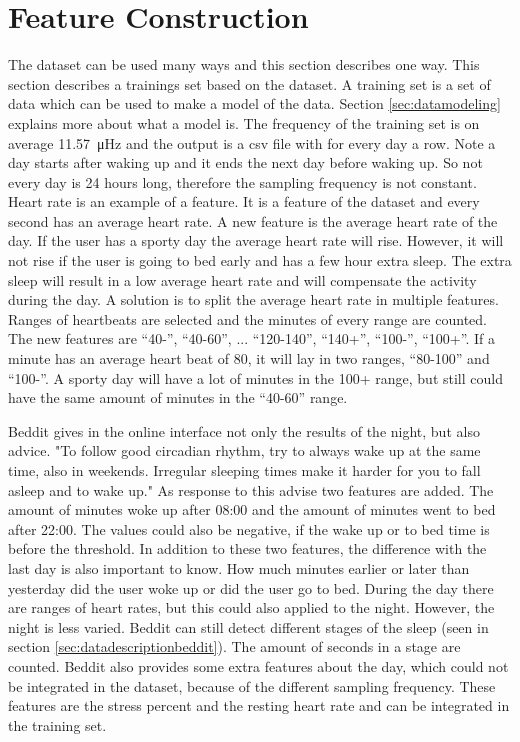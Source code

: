 	\section{Feature Construction}
		\label{sec:feature}
				The dataset can be used many ways and this section describes one way. This section describes a trainings set based on the dataset. A training set is a set of data which can be used to make a model of the data. Section \ref{sec:datamodeling} explains more about what a model is. The frequency of the training set is on average \SI{11.57}{\micro\hertz} and the output is a csv file with for every day a row. Note a day starts after waking up and it ends the next day before waking up. So not every day is 24 hours long, therefore the sampling frequency is not constant. Heart rate is an example of a feature. It is a feature of the dataset and every second has an average heart rate. A new feature is the average heart rate of the day. If the user has a sporty day the average heart rate will rise. However, it will not rise if the user is going to bed early and has a few hour extra sleep. The extra sleep will result in a low average heart rate and will compensate the activity during the day. A solution is to split the average heart rate in multiple features. Ranges of heartbeats are selected and the minutes of every range are counted. The new features are ``40-'', ``40-60'', ... ``120-140'', ``140+'', ``100-'', ``100+''. If a minute has an average heart beat of 80, it will lay in two ranges, ``80-100'' and ``100-''. A sporty day will have a lot of minutes in the 100+ range, but still could have the same amount of minutes in the ``40-60'' range. 

			Beddit gives in the online interface not only the results of the night, but also advice. "To follow good circadian rhythm, try to always wake up at the same time, also in weekends. Irregular sleeping times make it harder for you to fall asleep and to wake up." As response to this advise two features are added. The amount of minutes woke up after 08:00 and the amount of minutes went to bed after 22:00. The values could also be negative, if the wake up or to bed time is before the threshold. In addition to these two features, the difference with the last day is also important to know. How much minutes earlier or later than yesterday did the user woke up or did the user go to bed. 
			During the day there are ranges of heart rates, but this could also applied to the night. However, the night is less varied. Beddit can still detect different stages of the sleep (seen in section \ref{sec:datadescriptionbeddit}). The amount of seconds in a stage are counted.
			 Beddit also provides some extra features about the day, which could not be integrated in the dataset, because of the different sampling frequency. These features are the stress percent and the resting heart rate and can be integrated in the training set.
				
